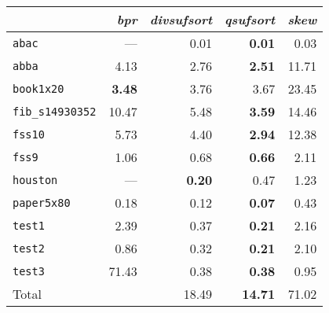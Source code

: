 \begin{tabular}{l r r r r } \toprule
 & \emph{bpr} & \emph{divsufsort} & \emph{qsufsort} & \emph{skew}\\ \midrule
\texttt{abac} & --- & 0.01 & \textbf{0.01} & 0.03\\
\texttt{abba} & 4.13 & 2.76 & \textbf{2.51} & 11.71\\
\texttt{book1x20} & \textbf{3.48} & 3.76 & 3.67 & 23.45\\
\texttt{fib\_s14930352} & 10.47 & 5.48 & \textbf{3.59} & 14.46\\
\texttt{fss10} & 5.73 & 4.40 & \textbf{2.94} & 12.38\\
\texttt{fss9} & 1.06 & 0.68 & \textbf{0.66} & 2.11\\
\texttt{houston} & --- & \textbf{0.20} & 0.47 & 1.23\\
\texttt{paper5x80} & 0.18 & 0.12 & \textbf{0.07} & 0.43\\
\texttt{test1} & 2.39 & 0.37 & \textbf{0.21} & 2.16\\
\texttt{test2} & 0.86 & 0.32 & \textbf{0.21} & 2.10\\
\texttt{test3} & 71.43 & 0.38 & \textbf{0.38} & 0.95\\
 \midrule
Total &  & 18.49 & \textbf{14.71} & 71.02\\
 \bottomrule
\end{tabular}
